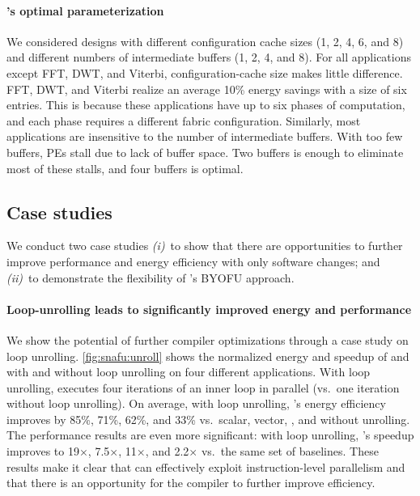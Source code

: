\paragraph{\snafu's optimal parameterization}
We considered designs with different configuration cache sizes (1, 2, 4, 6, and 8) and different numbers of intermediate buffers (1, 2, 4, and 8).
% 
For all applications except FFT, DWT, and Viterbi, configuration-cache size makes little difference.
% 
FFT, DWT, and Viterbi realize an average 10\% energy savings with a size of six entries.
% 
This is because these applications have up to six phases of computation, and each phase requires a different fabric configuration.
%
Similarly, most applications are insensitive to the number of intermediate buffers.
%
With too few buffers, PEs stall due to lack of buffer space.
%
Two buffers is enough to eliminate most of these stalls, and four buffers is optimal. 

\figSNAFUSensUnrollResults

\subsection{Case studies}
We conduct two case studies \emph{(i)}~to show that there are opportunities to further improve performance and energy efficiency with only software changes; and \emph{(ii)}~to demonstrate the flexibility of \snafuframe's BYOFU approach.

\paragraph{Loop-unrolling leads to significantly improved energy and performance}
We show the potential of further compiler optimizations through a case study on loop unrolling.
%
\autoref{fig:snafu:unroll} shows the normalized energy and speedup of \manic and \snafuarch with and without loop unrolling on four different applications.
%
With loop unrolling, \snafuarch executes four iterations of an inner loop in parallel (vs.\ one iteration without loop unrolling).
% 
On average, with loop unrolling, \snafuarch's energy efficiency improves by 85\%, 71\%, 62\%, and 33\% vs.\ scalar, vector, \manic, and \snafuarch without unrolling.
% 
The performance results are even more significant: with loop unrolling, \snafuarch's speedup improves to 19$\times$, 7.5$\times$, 11$\times$, and 2.2$\times$ vs.\
the same set of baselines.
%
These results make it clear that \snafuarch can effectively exploit instruction-level parallelism and that there is an opportunity for the compiler to further improve efficiency.

